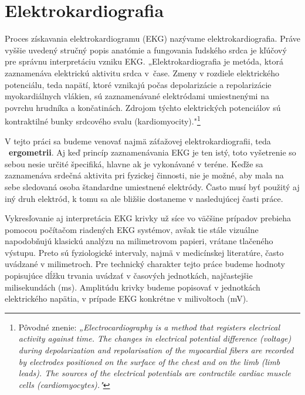 \section{Elektrokardiografia}

Proces získavania elektrokardiogramu (EKG) nazývame elektrokardiografia. Práve vyššie uvedený stručný popis anatómie a fungovania ľudského srdca je kľúčový pre správnu interpretáciu vzniku EKG. „Elektrokardiografia je metóda, ktorá zaznamenáva elektrickú aktivitu srdca v~čase. Zmeny v rozdiele elektrického potenciálu, teda napätí, ktoré vznikajú počas depolarizácie a repolarizácie myokardiálnych vlákien, sú zaznamenávané elektródami umiestnenými na povrchu hrudníka a končatinách. Zdrojom týchto elektrických potenciálov sú kontraktilné bunky srdcového svalu (kardiomyocity)."\footnote{Pôvodné znenie: \textit{„Electrocardiography is a method that registers electrical activity against time. The changes in electrical potential difference (voltage) during depolarization and repolarisation of the myocardial fibers are recorded by electrodes positioned on the surface of the chest and on the limb (limb leads). The sources of the electrical potentials are contractile cardiac muscle cells (cardiomyocytes)."}} \cite{Wasilewski2011}

V tejto práci sa budeme venovať najmä záťažovej elektrokardiografii, teda ~\textbf{ergometrii}. Aj keď princíp zaznamenávania EKG je ten istý, toto vyšetrenie so sebou nesie určité špecifiká, hlavne ak je vykonávané v teréne. Keďže sa zaznamenáva srdečná aktivita pri fyzickej činnosti, nie je možné, aby mala na sebe sledovaná osoba štandardne umiestnené elektródy. Často musí byť použitý aj iný druh elektród, k tomu sa ale bližšie dostaneme v nasledujúcej časti práce.

\newpage

Vykresľovanie aj interpretácia EKG krivky už síce vo väčšine prípadov prebieha pomocou počítačom riadených EKG systémov, avšak tie stále vizuálne napodobňujú klasickú analýzu na milimetrovom papieri, vrátane tlačeného výstupu. Preto sú fyziologické intervaly, najmä v medicínskej literatúre, často uvádzané v milimetroch. Pre technický charakter tejto práce budeme hodnoty popisujúce dĺžku trvania uvádzať v časových jednotkách, najčastejšie milisekundách (ms). Amplitúdu krivky budeme popisovať v jednotkách elektrického napätia, v prípade EKG konkrétne v milivoltoch (mV). 

